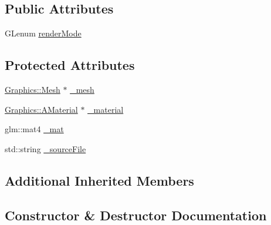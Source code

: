 \subsection*{Public Attributes}
\begin{DoxyCompactItemize}
\item 
G\+Lenum \mbox{\hyperlink{class_beer_engine_1_1_component_1_1_mesh_renderer_a77ba18c709e434a79615a35aec7d31e4}{render\+Mode}}
\end{DoxyCompactItemize}
\subsection*{Protected Attributes}
\begin{DoxyCompactItemize}
\item 
\mbox{\hyperlink{class_beer_engine_1_1_graphics_1_1_mesh}{Graphics\+::\+Mesh}} $\ast$ \mbox{\hyperlink{class_beer_engine_1_1_component_1_1_mesh_renderer_a34c2edf3787d59b0d608524ccaa4938f}{\+\_\+mesh}}
\item 
\mbox{\hyperlink{class_beer_engine_1_1_graphics_1_1_a_material}{Graphics\+::\+A\+Material}} $\ast$ \mbox{\hyperlink{class_beer_engine_1_1_component_1_1_mesh_renderer_a46919455807496f2bdd92bcfa6cacc75}{\+\_\+material}}
\item 
glm\+::mat4 \mbox{\hyperlink{class_beer_engine_1_1_component_1_1_mesh_renderer_a1b3d3cc5f1df80dd8850881cb6597d78}{\+\_\+mat}}
\item 
std\+::string \mbox{\hyperlink{class_beer_engine_1_1_component_1_1_mesh_renderer_a635e9ce507be213618738690212af983}{\+\_\+source\+File}}
\end{DoxyCompactItemize}
\subsection*{Additional Inherited Members}


\subsection{Constructor \& Destructor Documentation}
\mbox{\label{class_beer_engine_1_1_component_1_1_mesh_renderer_a9597f09757bac34c6f5c00d4cb18add3}} 
